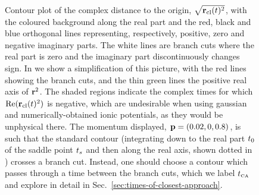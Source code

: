 \begin{figure}[t!]
  \centering
  \\[-1.5mm]
  \captionsetup{width=\textwidth}
  \caption[
  Riemann surface of $\sqrt{\rcl(t)^2}$ over the complex time plane, showing branch cuts that cross the standard integration path along the real axis
  ]{
  \protect{} Contour plot of the complex distance to the origin, $\sqrt{\rcl(t)^2}$, with the coloured background along the real part and the red, black and blue orthogonal lines representing, respectively, positive, zero and negative imaginary parts. The white lines are branch cuts where the real part is zero and the imaginary part discontinuously changes sign.
  In \protect{} we show a simplification of this picture, with the red lines showing the branch cuts, and the thin green lines the positive real axis of $\vb{r}^2$. The shaded regions indicate the complex times for which $\Re(\vb{r}_{\mathrm{cl}}(t)^2)$ is negative, which are undesirable when using gaussian and numerically-obtained ionic potentials, as they would be unphysical there.
  The momentum displayed, $\vb{p}=(0.02,0,0.8)$, is such that the standard contour (integrating down to the real part ${t_0}$ of the saddle point ${t_s}$ and then along the real axis, shown dotted in \protect{}) crosses a branch cut. Instead, one should choose a contour which passes through a time between the branch cuts, which we label ${t_{\scriptscriptstyle\mathrm{CA}}}$ and explore in detail in Sec.~\ref{sec:times-of-closest-approach}.
  }
  \label{f5-complex-position-branch-cuts}
  \vspace{-1.5mm}
\end{figure}


